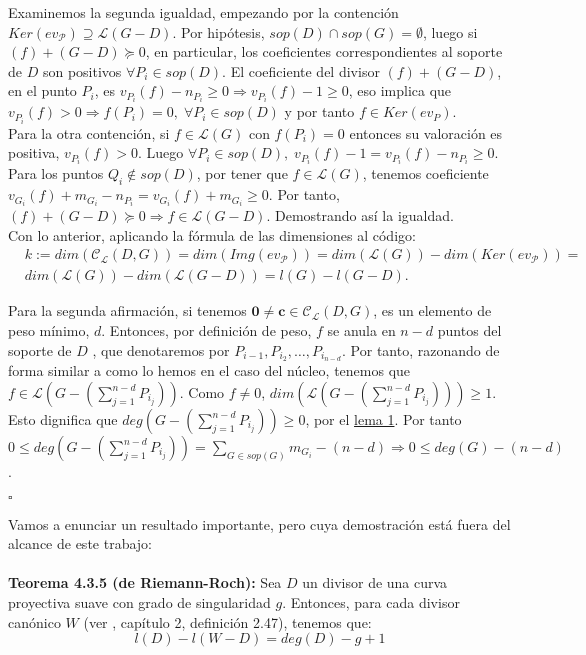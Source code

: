 \documentclass[11pt,spanish]{book}
\newcommand{\qed}{\begin{flushright} $\square$ \end{flushright}}
\begin{document}
Examinemos la segunda igualdad, empezando por la contención  $Ker(ev_{\mathcal{P}})\supseteq \mathcal{L}(G-D)$. Por hipótesis, $sop(D)\cap sop(G)=\emptyset$, luego si $(f)+(G-D)\succeq 0$, en particular, los coeficientes correspondientes al soporte de $D$ son positivos $\forall P_i\in sop(D)$. El coeficiente del divisor $(f)+(G-D)$, en el punto $P_i$, es $v_{P_i}(f)-n_{P_i}\geq 0\Rightarrow v_{P_i}(f) - 1\geq 0$, eso implica que $v_{P_i}(f)>0\Rightarrow f(P_i)=0,\;\forall P_i\in sop(D)$ y por tanto $f\in Ker(ev_P)$.\\
Para la otra contención, si $f\in\mathcal{L}(G)$ con $f(P_i)=0$ entonces su valoración es positiva, $v_{P_i}(f)> 0$. Luego $\forall P_i\in sop(D),\;v_{P_i}(f)-1=v_{P_i}(f)-n_{P_i}\geq 0$. Para los puntos $Q_i\notin sop(D)$, por tener que $f\in \mathcal{L}(G)$, tenemos coeficiente $v_{G_i}(f)+m_{G_i}-n_{P_i}=v_{G_i}(f)+m_{G_i}\geq 0$. Por tanto, $(f)+(G-D)\succeq 0\Rightarrow f\in \mathcal{L}(G-D)$. Demostrando así la igualdad.\\
Con lo anterior, aplicando la fórmula de las dimensiones al código:
\begin{align*}
&k:=dim(\mathcal{C}_{\mathcal{L}}(D,G))=dim(Img(ev_{\mathcal{P}}))=dim(\mathcal{L}(G))-dim(Ker(ev_{\mathcal{P}}))=\\
&dim(\mathcal{L}(G))-dim( \mathcal{L}(G-D))=l(G)-l(G-D). 
\end{align*}

Para la segunda afirmación, si tenemos $\mathbf{0}\neq \mathbf{c}\in\mathcal{C}_{\mathcal{L}}(D,G)$, es un elemento de peso mínimo, $d$. Entonces, por definición de peso, $f$ se anula en  $n-d$ puntos del soporte de $D$ , que denotaremos por $P_{i-1},P_{i_2},\ldots,P_{i_{n-d}}$. Por tanto, razonando de forma similar a como lo hemos en el caso del núcleo, tenemos que $f\in\mathcal{L}(G-(\sum_{j=1}^{n-d}P_{i_{j}}))$. Como $f\neq 0$, $dim(\mathcal{L}(G-(\sum_{j=1}^{n-d}P_{i_{j}})))\geq 1$. Esto dignifica que $deg(G-(\sum_{j=1}^{n-d}P_{i_{j}}))\geq0$, por el \hyperlink{lemaDivisores}{lema 1}. Por tanto $0\leq deg(G-(\sum_{j=1}^{n-d}P_{i_{j}}))=\sum_{G\in sop(G)}m_{G_i}-(n-d)\Rightarrow 0\leq deg(G)-(n-d)$. 

\qed

Vamos a enunciar un resultado importante, pero cuya demostración está fuera del alcance de este trabajo:\\
\\\hypertarget{riemann-roch}{\textbf{Teorema 4.3.5 (de Riemann-Roch): }}
Sea $D$ un divisor de una curva proyectiva suave con grado de singularidad $g$. Entonces, para cada divisor canónico $W$ (ver \cite{Tom-Høholdt}, capítulo 2, definición 2.47), tenemos que:
$$l(D)-l(W-D)=deg(D)-g+1$$
\end{document}
